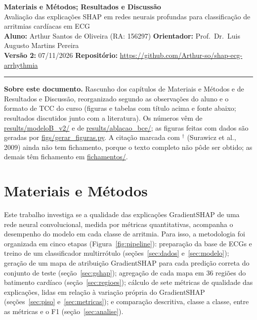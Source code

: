 \documentclass[11pt,a4paper]{article}
\begin{document}
\sloppy

\begin{center}
    {\LARGE \textbf{Materiais e Métodos; Resultados e Discussão}} \\[0.3em]
    {\large Avaliação das explicações SHAP em redes neurais profundas para classificação de arritmias cardíacas em ECG} \\[0.3em]
    \textbf{Aluno:} Arthur Santos de Oliveira (RA: 156297) \quad \textbf{Orientador:} Prof.\ Dr.\ Luis Augusto Martins Pereira \\[0.2em]
    \textbf{Versão 2:} 07/11/2026 \quad \textbf{Repositório:} \url{https://github.com/Arthur-so/shap-ecg-arrhythmia}
\end{center}
\vspace{-0.4em}
\hrule
\vspace{0.6em}

{\noindent\small\textbf{Sobre este documento.} Rascunho dos capítulos de Materiais e Métodos e de Resultados e Discussão, reorganizado segundo as observações do aluno e o formato de TCC do curso (figuras e tabelas com título acima e fonte abaixo; resultados discutidos junto com a literatura). Os números vêm de \url{results/modeloB_v2/} e de \url{results/ablacao_bce/}; as figuras feitas com dados são geradas por \url{figs/gerar_figuras.py}. A citação marcada com $^{\dagger}$ (Surawicz et al., 2009) ainda não tem fichamento, porque o texto completo não pôde ser obtido; as demais têm fichamento em \url{fichamentos/}.\par}

\section{Materiais e Métodos}\label{sec:metodos}

Este trabalho investiga se a qualidade das explicações GradientSHAP de uma rede neural convolucional, medida por métricas quantitativas, acompanha o desempenho do modelo em cada classe de arritmia. Para isso, a metodologia foi organizada em cinco etapas (Figura~\ref{fig:pipeline}): preparação da base de ECGs e treino de um classificador multirrótulo (seções~\ref{sec:dados} e~\ref{sec:modelo}); geração de um mapa de atribuição GradientSHAP para cada predição correta do conjunto de teste (seção~\ref{sec:gshap}); agregação de cada mapa em 36 regiões do batimento cardíaco (seção~\ref{sec:regioes}); cálculo de sete métricas de qualidade das explicações, lidas em relação à variação própria do GradientSHAP (seções~\ref{sec:piso} e~\ref{sec:metricas}); e comparação descritiva, classe a classe, entre as métricas e o F1 (seção~\ref{sec:analise}).
\end{document}
